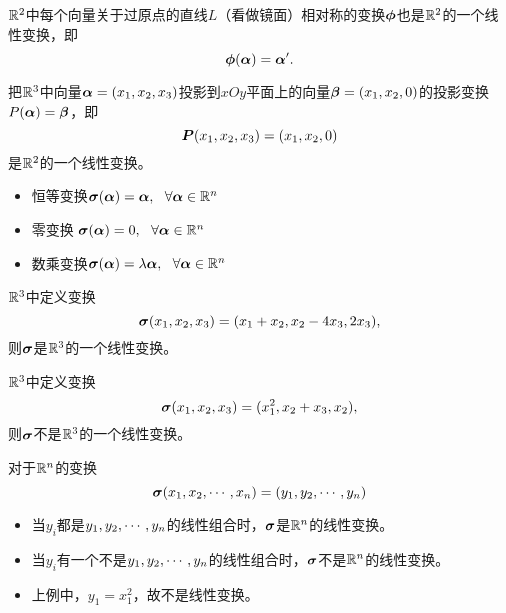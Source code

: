 \begin{frame}
  \begin{li}
    $\mathbb R^2$中每个向量关于过原点的直线$L$（看做镜面）相对称的变换$\boldsymbol{\phi}$也是$\mathbb R^2$的一个线性变换，即
    $$
    \boldsymbol{\phi}(\boldsymbol{\alpha})=\boldsymbol{\alpha}^\prime.
    $$
  \end{li}
\end{frame}

\begin{frame}
  \begin{li}[投影变换]
    把$\mathbb R^3$中向量$\boldsymbol{\alpha}=(x_1,x_2,x_3)$投影到$xOy$平面上的向量$\boldsymbol{\beta}=(x_1,x_2,0)$的投影变换$P(\boldsymbol{\alpha})=\boldsymbol{\beta}$，即
    $$
    \boldsymbol{P}(x_1,x_2,x_3)=(x_1,x_2,0)
    $$
    是$\mathbb R^2$的一个线性变换。
  \end{li}
\end{frame}

\begin{frame}
  \begin{li}
    \begin{itemize}
    \item 恒等变换$\boldsymbol{\sigma}(\boldsymbol{\alpha})=\boldsymbol{\alpha}, ~~\forall \boldsymbol{\alpha}\in\mathbb R^n$
    \item 零变换 $\boldsymbol{\sigma}(\boldsymbol{\alpha})=0, ~~\forall \boldsymbol{\alpha}\in\mathbb R^n$
    \item 数乘变换$\boldsymbol{\sigma}(\boldsymbol{\alpha})=\lambda\boldsymbol{\alpha}, ~~\forall \boldsymbol{\alpha}\in\mathbb R^n$
    \end{itemize}
  \end{li}
\end{frame}

\begin{frame}
  \begin{li}
    $\mathbb R^3$中定义变换
    $$
    \boldsymbol{\sigma}(x_1,x_2,x_3)=(x_1+x_2,x_2-4x_3,2x_3),
    $$
    则$\boldsymbol{\sigma}$是$\mathbb R^3$的一个线性变换。
  \end{li}
\end{frame}

\begin{frame}
  \begin{li}
    $\mathbb R^3$中定义变换
    $$
    \boldsymbol{\sigma}(x_1,x_2,x_3)=(x_1^2,x_2+x_3,x_2),
    $$
    则$\boldsymbol{\sigma}$不是$\mathbb R^3$的一个线性变换。
  \end{li}
\end{frame}

\begin{frame}
  对于$\mathbb R^n$的变换
  $$
  \boldsymbol{\sigma}(x_1,x_2,\cdots,x_n)=(y_1,y_2,\cdots,y_n)
  $$
  \begin{itemize}
  \item 当$y_i$都是$y_1,y_2,\cdots,y_n$的线性组合时，$\boldsymbol{\sigma}$是$\mathbb R^n$的线性变换。\\[0.1in]
  \item 当$y_i$有一个不是$y_1,y_2,\cdots,y_n$的线性组合时，$\boldsymbol{\sigma}$不是$\mathbb R^n$的线性变换。 \\[0.1in]
  \item[] 上例中，$y_1=x_1^2$，故不是线性变换。
  \end{itemize}
\end{frame}



